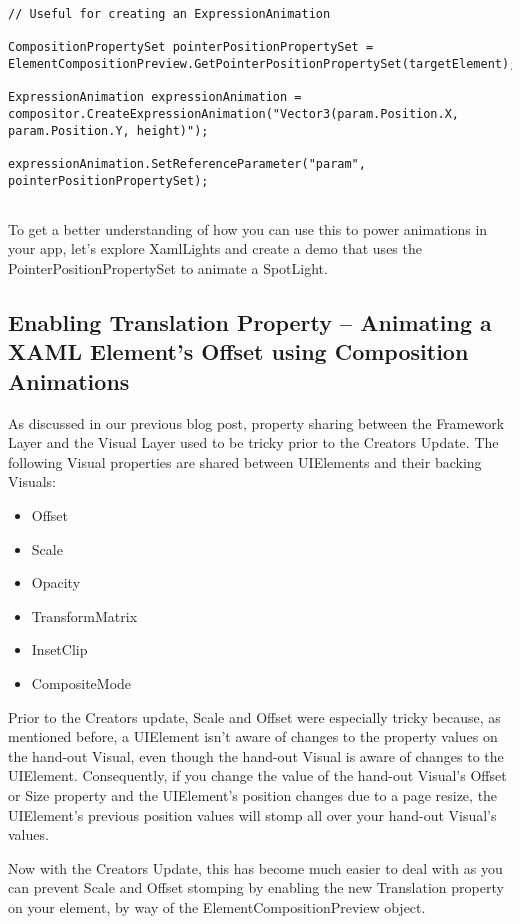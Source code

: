 \begin{lstlisting}[style=CSharpStyle]
// Useful for creating an ExpressionAnimation

CompositionPropertySet pointerPositionPropertySet = ElementCompositionPreview.GetPointerPositionPropertySet(targetElement);

ExpressionAnimation expressionAnimation = compositor.CreateExpressionAnimation("Vector3(param.Position.X, param.Position.Y, height)");

expressionAnimation.SetReferenceParameter("param", pointerPositionPropertySet);


\end{lstlisting}


To get a better understanding of how you can use this to power animations in your app, let’s explore XamlLights and create a demo that uses the PointerPositionPropertySet to animate a SpotLight.

\subsection{Enabling Translation Property – Animating a XAML Element’s Offset using Composition Animations}

As discussed in our previous blog post, property sharing between the Framework Layer and the Visual Layer used to be tricky prior to the Creators Update. The following Visual properties are shared between UIElements and their backing Visuals:

\begin{itemize}
	\item Offset
	\item Scale
	\item Opacity
	\item TransformMatrix
	\item InsetClip
	\item CompositeMode
\end{itemize}

Prior to the Creators update, Scale and Offset were especially tricky because, as mentioned before, a UIElement isn’t aware of changes to the property values on the hand-out Visual, even though the hand-out Visual is aware of changes to the UIElement. Consequently, if you change the value of the hand-out Visual’s Offset or Size property and the UIElement’s position changes due to a page resize, the UIElement’s previous position values will stomp all over your hand-out Visual’s values.

Now with the Creators Update, this has become much easier to deal with as you can prevent Scale and Offset stomping by enabling the new Translation property on your element, by way of the ElementCompositionPreview object.

